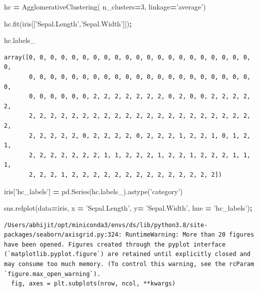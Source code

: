 \documentclass[
  letterpaper,
]{scrbook}
\newenvironment{Shaded}{\begin{snugshade}}{\end{snugshade}}
\newcommand{\DecValTok}[1]{\textcolor[rgb]{0.00,0.00,0.81}{#1}}
\newcommand{\NormalTok}[1]{#1}
\newcommand{\OperatorTok}[1]{\textcolor[rgb]{0.81,0.36,0.00}{\textbf{#1}}}
\newcommand{\StringTok}[1]{\textcolor[rgb]{0.31,0.60,0.02}{#1}}
\begin{document}
\begin{Shaded}
\begin{Highlighting}[]
\NormalTok{hc }\OperatorTok{=}\NormalTok{ AgglomerativeClustering( n_clusters}\OperatorTok{=}\DecValTok{3}\NormalTok{,}
\NormalTok{                             linkage}\OperatorTok{=}\StringTok{'average'}\NormalTok{)}

\NormalTok{hc.fit(iris[[}\StringTok{'Sepal.Length'}\NormalTok{,}\StringTok{'Sepal.Width'}\NormalTok{]])}\OperatorTok{;}
\end{Highlighting}
\end{Shaded}

\begin{Shaded}
\begin{Highlighting}[]
\NormalTok{hc.labels_}
\end{Highlighting}
\end{Shaded}

\begin{verbatim}
array([0, 0, 0, 0, 0, 0, 0, 0, 0, 0, 0, 0, 0, 0, 0, 0, 0, 0, 0, 0, 0, 0,
       0, 0, 0, 0, 0, 0, 0, 0, 0, 0, 0, 0, 0, 0, 0, 0, 0, 0, 0, 0, 0, 0,
       0, 0, 0, 0, 0, 0, 2, 2, 2, 2, 2, 2, 2, 0, 2, 0, 0, 2, 2, 2, 2, 2,
       2, 2, 2, 2, 2, 2, 2, 2, 2, 2, 2, 2, 2, 2, 2, 2, 2, 2, 2, 2, 2, 2,
       2, 2, 2, 2, 2, 0, 2, 2, 2, 2, 0, 2, 2, 2, 1, 2, 2, 1, 0, 1, 2, 1,
       2, 2, 2, 2, 2, 2, 2, 1, 1, 2, 2, 2, 1, 2, 2, 1, 2, 2, 2, 1, 1, 1,
       2, 2, 2, 1, 2, 2, 2, 2, 2, 2, 2, 2, 2, 2, 2, 2, 2, 2])
\end{verbatim}

\begin{Shaded}
\begin{Highlighting}[]
\NormalTok{iris[}\StringTok{'hc_labels'}\NormalTok{] }\OperatorTok{=}\NormalTok{ pd.Series(hc.labels_).astype(}\StringTok{'category'}\NormalTok{)}

\NormalTok{sns.relplot(data}\OperatorTok{=}\NormalTok{iris, x }\OperatorTok{=} \StringTok{'Sepal.Length'}\NormalTok{, y}\OperatorTok{=} \StringTok{'Sepal.Width'}\NormalTok{, }
\NormalTok{           hue }\OperatorTok{=} \StringTok{'hc_labels'}\NormalTok{)}\OperatorTok{;}
\end{Highlighting}
\end{Shaded}

\begin{verbatim}
/Users/abhijit/opt/miniconda3/envs/ds/lib/python3.8/site-packages/seaborn/axisgrid.py:324: RuntimeWarning: More than 20 figures have been opened. Figures created through the pyplot interface (`matplotlib.pyplot.figure`) are retained until explicitly closed and may consume too much memory. (To control this warning, see the rcParam `figure.max_open_warning`).
  fig, axes = plt.subplots(nrow, ncol, **kwargs)
\end{verbatim}
\end{document}
